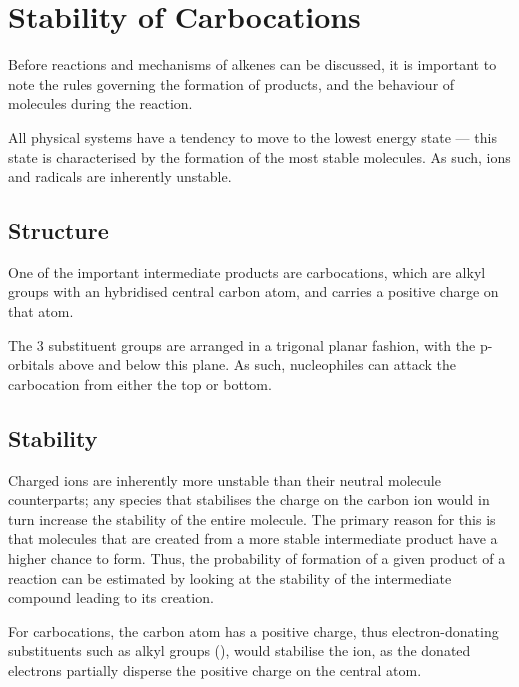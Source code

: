 	\section{Stability of Carbocations}

		Before reactions and mechanisms of alkenes can be discussed, it is important to note the rules governing the formation
		of products, and the behaviour of molecules during the reaction.

		All physical systems have a tendency to move to the lowest energy state --- this state is characterised by the formation
		of the most stable molecules. As such, ions and radicals are inherently unstable.

		\subsection{Structure}

			One of the important intermediate products are carbocations, which are alkyl groups with an \sptwo hybridised
			central carbon atom, and carries a positive charge on that atom.


			The 3 substituent groups are arranged in a trigonal planar fashion, with the p-orbitals above and below this
			plane. As such, nucleophiles can attack the carbocation from either the top or bottom.



		\subsection{Stability}

			Charged ions are inherently more unstable than their neutral molecule counterparts; any species that stabilises
			the charge on the carbon ion would in turn increase the stability of the entire molecule. The primary reason for
			this is that molecules that are created from a more stable intermediate product have a higher chance to form. Thus,
			the probability of formation of a given product of a reaction can be estimated by looking at the stability of
			the intermediate compound leading to its creation.

			For carbocations, the carbon atom has a positive charge, thus electron-donating substituents such as alkyl
			groups (), would stabilise the ion, as the donated electrons partially disperse the positive charge on the
			central atom.

